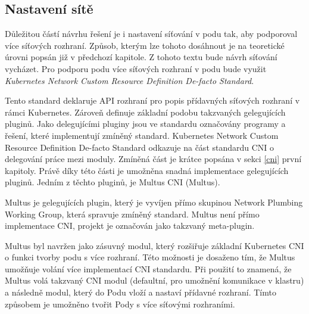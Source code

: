 \subsection{Nastavení sítě}
Důležitou částí návrhu řešení je i nastavení síťování v podu tak, aby podporoval více síťových rozhraní. Způsob, kterým lze tohoto dosáhnout je na teoretické úrovni popsán již v předchozí kapitole. Z tohoto textu bude návrh síťování vycházet. Pro podporu podu více síťových rozhraní v podu bude využit \textit{Kubernetes Network Custom Resource Definition De-facto Standard}.   

Tento standard deklaruje API rozhraní pro popis přídavných síťových rozhraní v rámci Kubernetes. Zároveň definuje základní podobu takzvaných gelegujících pluginů. Jako delegujícími pluginy jsou ve standardu označovány programy a řešení, které implementují zmíněný standard. Kubernetes Network Custom Resource Definition De-facto Standard odkazuje na část standardu CNI o delegování práce mezi moduly. Zmíněná část je krátce popsána v sekci \ref{cni}  první kapitoly. Právě díky této části je umožněna snadná implementace gelegujících pluginů. Jedním z těchto pluginů, je Multus CNI (Multus). 



Multus je gelegujících plugin, který je vyvíjen přímo skupinou Network Plumbing Working Group, která spravuje zmíněný standard. Multus není přímo implementace CNI, projekt je označován jako takzvaný meta-plugin. \cite{hayashi_2019_multuscni}

Multus byl navržen jako zásuvný modul, který rozšiřuje základní Kubernetes CNI o funkci tvorby podu s více rozhraní. Této možnosti je dosaženo tím, že Multus umožňuje volání více implementací CNI standardu. Při použití to znamená, že Multus volá takzvaný  CNI modul (defaultní, pro umožnění komunikace v klastru) a následně  modul, který do Podu vloží a nastaví přídavné rozhraní. Tímto způsobem je umožněno tvořit Pody s více síťovými rozhraními.\cite{hayashi_2019_multuscni}

